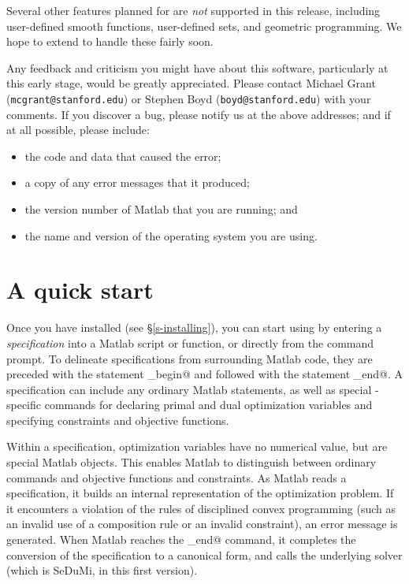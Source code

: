 \documentclass[12pt]{article}
\begin{document}
Several other features planned for
\cvx are \emph{not} supported in this 
release, including user-defined smooth functions, user-defined sets,
and geometric programming.
We hope to extend \cvx to handle these fairly soon.

Any feedback and criticism you might
have about this software, particularly at this early stage,
would be greatly appreciated.
Please contact Michael Grant (\texttt{mcgrant@stanford.edu}) or
Stephen Boyd (\texttt{boyd@stanford.edu}) with your comments. If
you discover a bug, please notify us at the above addresses; and
if at all possible, please include:
\begin{itemize}
\item the code and data that caused the error;
\item a copy of any error messages that it produced;
\item the version number of Matlab that you are running; and
\item the name and version of the operating system you are using.
\end{itemize}

\section{A quick start}
\label{sec:quickstart}

Once you have installed \cvx (see \S\ref{s-installing}), you can
start using \cvx by entering a \cvx \emph{specification} into a
Matlab script or function, or directly from the command prompt.
To delineate \cvx specifications from surrounding Matlab code,
they are preceded with the statement
\verb@cvx_begin@ and followed with the statement
\verb@cvx_end@. A specification can
include any ordinary Matlab statements, as well as
special \cvx-specific commands for declaring primal and dual 
optimization variables and specifying constraints and
objective functions.

Within a \cvx specification, optimization variables have no numerical
value, but are special Matlab objects.   
This enables Matlab to distinguish
between ordinary commands and \cvx objective
functions and constraints. As Matlab reads a \cvx specification,
it builds an internal representation of the
optimization problem. If it encounters a
violation of the rules of disciplined convex programming
(such as an invalid use of a composition rule or an invalid
constraint), an error message is generated.
When Matlab reaches 
the \verb@cvx_end@ command, it completes the conversion of
the \cvx specification to a canonical form,
and calls the underlying solver 
(which is SeDuMi, in this first version).
\end{document}
